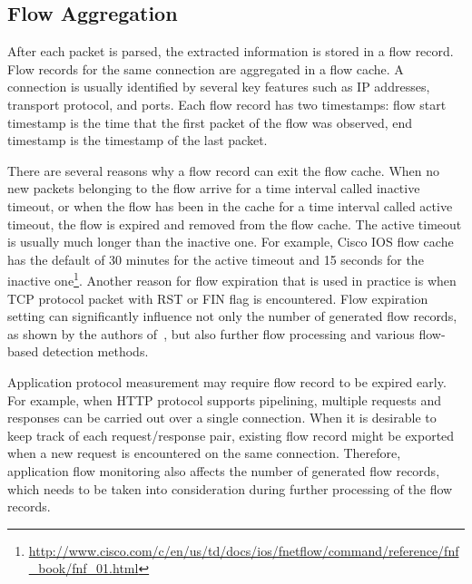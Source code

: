 \subsection{Flow Aggregation}

After each packet is parsed, the extracted information is stored in a flow record. Flow records for the same connection are aggregated in a flow cache. A connection is usually identified by several key features such as IP addresses, transport protocol, and ports. Each flow record has two timestamps: flow start timestamp is the time that the first packet of the flow was observed, end timestamp is the timestamp of the last packet. 

There are several reasons why a flow record can exit the flow cache. When no new packets belonging to the flow arrive for a time interval called inactive timeout, or when the flow has been in the cache for a time interval called active timeout, the flow is expired and removed from the flow cache. The active timeout is usually much longer than the inactive one. For example, Cisco IOS flow cache has the default of 30 minutes for the active timeout and 15 seconds for the inactive one\footnote{\url{http://www.cisco.com/c/en/us/td/docs/ios/fnetflow/command/reference/fnf\_book/fnf\_01.html}}. Another reason for flow expiration that is used in practice is when TCP protocol packet with RST or FIN flag is encountered. Flow expiration setting can significantly influence not only the  number of generated flow records, as shown by the authors of~\cite{Rodriguez-2013-Empirical}, but also further flow processing and various flow-based detection methods.

Application protocol measurement may require flow record to be expired early. For example, when HTTP protocol supports pipelining, multiple requests and responses can be carried out over a single connection. When it is desirable to keep track of each request/response pair, existing flow record might be exported when a new request is encountered on the same connection. Therefore, application flow monitoring  also affects the number of generated flow records, which needs to be taken into consideration during further processing of the flow records.


